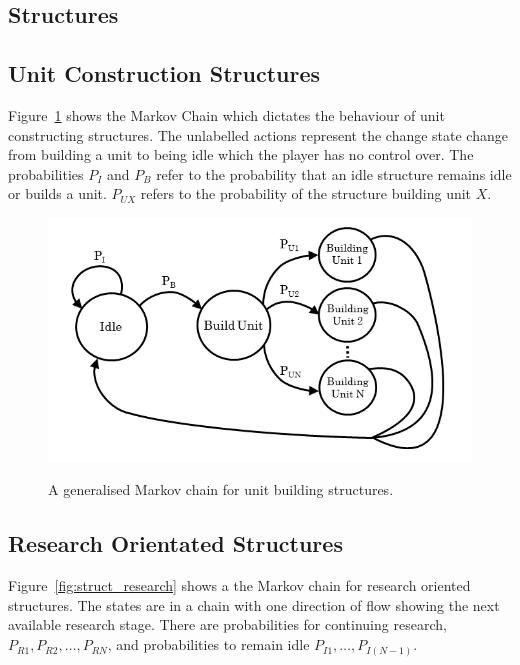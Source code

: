 \subsection{Structures}

\subsection{Unit Construction Structures}


Figure~\ref{fig:struct_units} shows the Markov Chain which dictates the behaviour of unit constructing structures. The unlabelled actions represent the change state change from building a unit to being idle which the player has no control over. The probabilities \(P_{I}\) and \(P_{B}\) refer to the probability that an idle structure remains idle or builds a unit. \(P_{UX}\) refers to the probability of the structure building unit \(X\).

\begin{figure}[ht]
\centering
\includegraphics[scale=0.8, trim = 0cm 0cm 0cm 2cm]{diagrams/building_units}
\label{fig:struct_units}
\caption{A generalised Markov chain for unit building structures.}
\end{figure}

\subsection{Research Orientated Structures}

Figure~\ref{fig:struct_research} shows a the Markov chain for research oriented structures. The states are in a chain with one direction of flow showing the next available research stage. There are probabilities for continuing research, \(P_{R1}, P_{R2}, \ldots, P_{RN}\), and probabilities to remain idle \(P_{I1}, \ldots, P_{I(N-1)}\).

